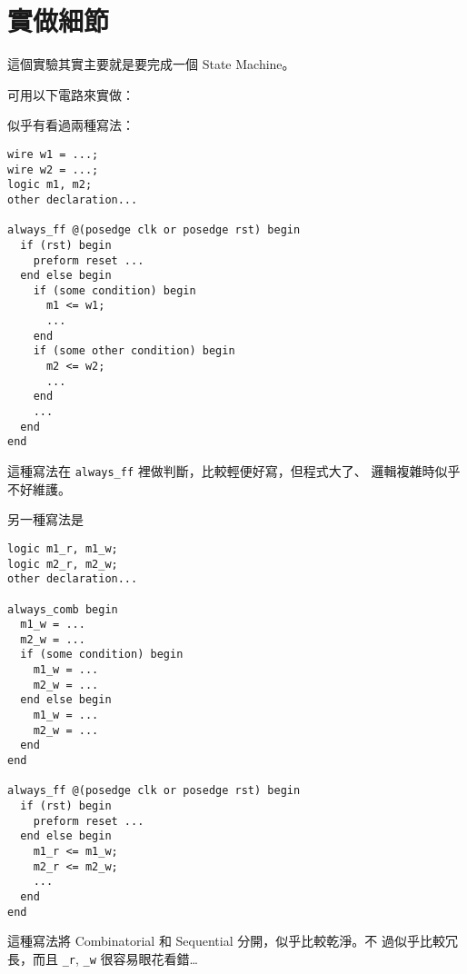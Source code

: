 \documentclass[12pt, a4paper]{article}
\begin{document}
\section{實做細節}
這個實驗其實主要就是要完成一個 State Machine。
\begin{figure}[H]
  \centering
\end{figure}
可用以下電路來實做：
\begin{figure}[H]
  \centering
\end{figure}

似乎有看過兩種寫法：
\begin{verbatim}
wire w1 = ...;
wire w2 = ...;
logic m1, m2;
other declaration...

always_ff @(posedge clk or posedge rst) begin
  if (rst) begin
    preform reset ...
  end else begin
    if (some condition) begin
      m1 <= w1;
      ...
    end
    if (some other condition) begin
      m2 <= w2;
      ...
    end
    ...
  end
end
\end{verbatim}
這種寫法在 \texttt{always_ff} 裡做判斷，比較輕便好寫，但程式大了、
邏輯複雜時似乎不好維護。

另一種寫法是
\begin{verbatim}
logic m1_r, m1_w;
logic m2_r, m2_w;
other declaration...

always_comb begin
  m1_w = ...
  m2_w = ...
  if (some condition) begin
    m1_w = ...
    m2_w = ...
  end else begin
    m1_w = ...
    m2_w = ...
  end
end

always_ff @(posedge clk or posedge rst) begin
  if (rst) begin
    preform reset ...
  end else begin
    m1_r <= m1_w;
    m2_r <= m2_w;
    ...
  end
end
\end{verbatim}
這種寫法將 Combinatorial 和 Sequential 分開，似乎比較乾淨。不
過似乎比較冗長，而且 \texttt{\_r}, \texttt{\_w} 很容易眼花看錯…
\end{document}
